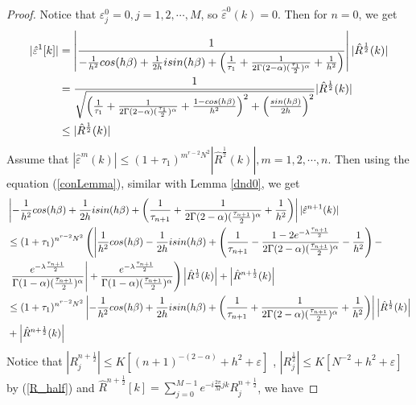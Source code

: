 \documentclass[10pt,a4paper]{amsart}
\begin{document}
\begin{proof}
    Notice that $\varepsilon^0_j=0, j=1, 2, \cdots, M$, so $\hat{\varepsilon}^0(k)=0$. Then for $n=0$, we get 
    \begin{align}
    |\hat{\varepsilon}^{1}[k]|&= \left|\frac{1}{-\frac{1}{h^2}cos(h\beta)+\frac{1}{2h}isin(h\beta)+\left(\frac{1}{\tau_{1}}+\frac{1}{2\Gamma(2-\alpha)(\frac{\tau_{1}}{2})^\alpha}+\frac{1}{h^2}\right)}\right||\hat{R}^{\frac{1}{2}}(k)|\notag\\
    &=\frac{1}{\sqrt{\left( \frac{1}{\tau_1}+\frac{1}{2\Gamma(2-\alpha)(\frac{\tau_{1}}{2})^\alpha}+\frac{1-cos(h\beta)}{h^2}\right)^2+\left(\frac{sin(h\beta)}{2h}\right)^2}}|\hat{R}^{\frac{1}{2}}(k)|\notag\\
    &\leq |\hat{R}^{\frac{1}{2}}(k)|\notag
\end{align}
Assume that $|\hat{\varepsilon}^m(k)|\leq (1+\tau_1)^{m^{r-2}N^{2}}|\hat{R}^{\frac{1}{2}}(k)|, m=1, 2, \cdots, n$. Then using the equation (\ref{conLemma}), similar with Lemma \ref{dnd0}, we get
\begin{align}
    &\left|-\frac{1}{h^2}cos(h\beta)+\frac{1}{2h}isin(h\beta)+\left(\frac{1}{\tau_{n+1}}+\frac{1}{2\Gamma(2-\alpha)(\frac{\tau_{n+1}}{2})^\alpha}+\frac{1}{h^2}\right) \right||\hat{\varepsilon}^{n+1}(k)|\notag \\
    &\leq (1+\tau_1)^{n^{r-2}N^{2}}\left(\left|\frac{1}{h^2}cos(h\beta)-\frac{1}{2h}isin(h\beta)+\left(\frac{1}{\tau_{n+1}}-\frac{1-2e^{-\lambda \frac{\tau_{n+1}}{2}}}{2\Gamma(2-\alpha)(\frac{\tau_{n+1}}{2})^\alpha}-\frac{1}{h^2}\right) -\right. \right. \notag\\
    &\left. \left. \frac{e^{-\lambda \frac{\tau_{n+1}}{2}}}{\Gamma(1-\alpha)(\frac{\tau_{n+1}}{2})^\alpha}\right|+\frac{e^{-\lambda \frac{\tau_{n+1}}{2}}}{\Gamma(1-\alpha)(\frac{\tau_{n+1}}{2})^\alpha}\right) \left|\hat{R}^{\frac{1}{2}}(k)\right|+\left|\hat{R}^{n+\frac{1}{2}}(k)\right| \notag\\
    &\leq (1+\tau_1)^{n^{r-2}N^{2}}\left|-\frac{1}{h^2}cos(h\beta)+\frac{1}{2h}isin(h\beta)+\left(\frac{1}{\tau_{n+1}}+\frac{1}{2\Gamma(2-\alpha)(\frac{\tau_{n+1}}{2})^\alpha}+\frac{1}{h^2}\right) \right|\left|\hat{R}^{\frac{1}{2}}(k)\right|\notag\\
    &+\left|\hat{R}^{n+\frac{1}{2}}(k)\right| \label{xi}
\end{align}
Notice that $\left|R_j^{n+\frac{1}{2}}\right| \leq K[(n+1)^{-(2-\alpha)}+h^2+\varepsilon]$ ,  $\left|R_j^{\frac{1}{2}}\right| \leq K[N^{-2}+h^2+\varepsilon]$ by (\ref{R_half}) and $\hat{R}^{n+\frac{1}{2}}[k]=\sum_{j=0}^{M-1} e^{-i \frac{2 \pi}{M} j k} R^{n+\frac{1}{2}}_j $, we have

\end{proof}
\end{document}
